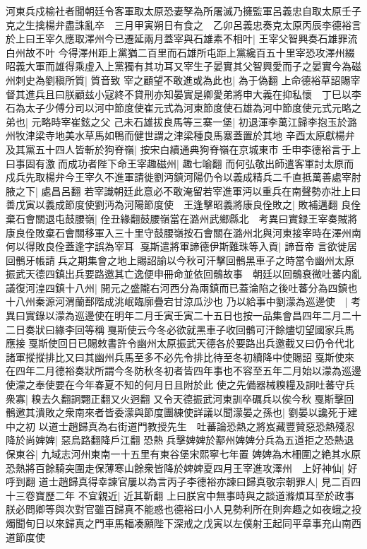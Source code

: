 河東兵戍榆社者聞朝廷令客軍取太原恐妻孥為所屠滅乃擁監軍呂義忠自取太原壬子克之生擒楊弁盡誅亂卒　三月甲寅朔日有食之　乙卯呂義忠奏克太原丙辰李德裕言於上曰王宰久應取澤州今已遷延兩月蓋宰與石雄素不相叶|{
	王宰父智興奏石雄罪流白州故不叶}
今得澤州距上黨猶二百里而石雄所屯距上黨纔百五十里宰恐攻澤州綴昭義大軍而雄得乘虛入上黨獨有其功耳又宰生子晏實其父智興愛而子之晏實今為磁州刺史為劉稹所質|{
	質音致}
宰之顧望不敢進或為此也|{
	為于偽翻}
上命德裕草詔賜宰督其進兵且曰朕顧兹小寇終不貸刑亦知晏實是卿愛弟將申大義在抑私懷　丁巳以李石為太子少傅分司以河中節度使崔元式為河東節度使石雄為河中節度使元式元略之弟也|{
	元略時宰崔鉉之父}
己未石雄拔良馬等三寨一堡|{
	初退渾李萬江歸李抱玉於潞州牧津梁寺地美水草馬如鴨而健世謂之津梁種良馬寨蓋置於其地}
辛酉太原獻楊弁及其黨五十四人皆斬於狗脊嶺|{
	按宋白續通典狗脊嶺在京城東市}
壬申李德裕言于上曰事固有激而成功者陛下命王宰趣磁州|{
	趣七喻翻}
而何弘敬出師遣客軍討太原而戍兵先取楊弁今王宰久不進軍請徙劉沔鎮河陽仍令以義成精兵二千直抵萬善處宰肘腋之下|{
	處昌呂翻}
若宰識朝廷此意必不敢淹留若宰進軍沔以重兵在南聲勢亦壯上曰善戊寅以義成節度使劉沔為河陽節度使　王逢擊昭義將康良佺敗之|{
	敗補邁翻}
良佺棄石會關退屯鼓腰嶺|{
	佺丑緣翻鼓腰嶺當在潞州武鄉縣北　考異曰實録王宰奏賊將康良佺敗棄石會關移軍入三十里守鼓腰嶺按石會關在潞州北與河東接宰時在澤州南何以得敗良佺蓋逢字誤為宰耳}
戛斯遣將軍諦德伊斯難珠等入貢|{
	諦音帝}
言欲徙居回鶻牙帳請兵之期集會之地上賜詔諭以今秋可汗擊回鶻黑車子之時當令幽州太原振武天德四鎮出兵要路邀其亡逸便申冊命並依回鶻故事　朝廷以回鶻衰微吐蕃内亂議復河湟四鎮十八州|{
	開元之盛隴右河西分為兩鎮而已蓋淪陷之後吐蕃分為四鎮也十八州秦源河渭蘭鄯階成洮岷臨廓疊宕甘涼瓜沙也}
乃以給事中劉濛為巡邊使　|{
	考異曰實錄以濛為巡邊使在明年二月壬寅壬寅二十五日也按一品集會昌四年二月二十二日奏狀曰緣李回等稱戛斯使云今冬必欲就黑車子收回鶻可汗餘燼切望國家兵馬應接戛斯使回日已賜敕書許令幽州太原振武天德各於要路出兵邀截又曰仍令代北諸軍摐摐排比又曰其幽州兵馬至多不必先令排比待至冬初續降中使賜詔戛斯使來在四年二月德裕奏狀所謂今冬防秋冬初者皆四年事也不容至五年二月始以濛為巡邊使濛之奉使要在今年春夏不知的何月日且附於此}
使之先備器械糗糧及詗吐蕃守兵衆寡|{
	糗去久翻詗翾正翻又火迥翻}
又令天德振武河東訓卒礪兵以俟今秋戛斯擊回鶻邀其潰敗之衆南來者皆委濛與節度團練使詳議以聞濛晏之孫也|{
	劉晏以讒死于建中之初}
以道士趙歸真為右街道門教授先生　吐蕃論恐熱之將岌藏豐贊惡恐熱殘忍降於尚婢婢|{
	惡烏路翻降戶江翻}
恐熱兵擊婢婢於鄯州婢婢分兵為五道拒之恐熱退保東谷|{
	九域志河州東南一十五里有東谷堡宋熙寧七年置}
婢婢為木柵圍之絶其水原恐熱將百餘騎突圍走保薄寒山餘衆皆降於婢婢夏四月王宰進攻澤州　上好神仙|{
	好呼到翻}
道士趙歸真得幸諫官屢以為言丙子李德裕亦諫曰歸真敬宗朝罪人|{
	見二百四十三卷寶歷二年}
不宜親近|{
	近其靳翻}
上曰朕宮中無事時與之談道滌煩耳至於政事朕必問卿等與次對官雖百歸真不能惑也德裕曰小人見勢利所在則奔趣之如夜蛾之投燭聞旬日以來歸真之門車馬輻凑願陛下深戒之戊寅以左僕射王起同平章事充山南西道節度使

